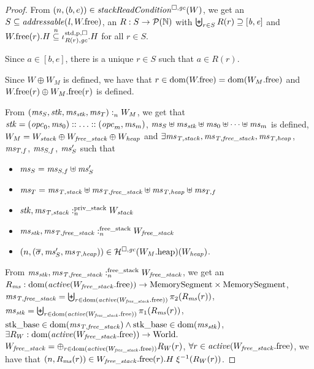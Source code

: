 \begin{proof}
  From $\npair{(b,e)}\in\stackReadCond{W}$, we get an $S \subseteq \addressable{\lin,
    \pwfree}$, an $R : S \rightarrow \powerset{\nats}$ with $\biguplus_{r \in S} R(r) \supseteq [\baddr,\eaddr]$ and $\pwfree(r).H
  \nsubeq \stdreg{R(r),\gc}{\pur}.H$ for all $r \in S$.

  Since $a \in [b,e]$, there is a unique $r \in S$ such that $a \in R(r)$.

  Since $W \oplus W_M$ is defined, we have that $r \in \dom(\pwfree) =
  \dom(\pwfree[W_M])$ and $\pwfree(r) \oplus \pwfree[W_M](r)$ is defined.

  From $\memSat{(\ms_S,\stk,\ms_\stk,\ms_T)}{W_M}$, we get that
  $\stk = (\opc_0,\ms_0):: \dots :: (\opc_m,\ms_m)$,
  $\ms_S \uplus \ms_\stk \uplus \ms_0 \uplus \dots \uplus \ms_m$ is defined,
  $W_M = W_{\var{stack}} \oplus W_{\var{free\_stack}} \oplus W_{\var{heap}}$ and
  $\exists \ms_\var{T,stack}, \ms_\var{T,free\_stack}, \ms_\var{T,heap}$, $\ms_{T,f}$, $\ms_{S,f}$, $\ms_S'$ such that
  \begin{itemize}
  \item $\ms_S =\ms_{S,f} \uplus \ms_S'$
  \item $\ms_T = \ms_\var{T,stack} \uplus \ms_\var{T,free\_stack} \uplus
    \ms_\var{T,heap} \uplus \ms_{T,f}$
  \item $\memSatStack{\stk,\ms_\var{T,stack}}{W_{\var{stack}}}$
  \item $\memSatFStack{\ms_\stk,\ms_\var{T,free\_stack}}{W_{\var{free\_stack}}}$
  \item $\npair{(\overline{\sigma},\ms_S',\ms_\var{T,heap})}\in\lrheap(\pwheap[W_M])(W_\var{heap})$.
  \end{itemize}

  From $\memSatFStack{\ms_\stk,\ms_\var{T,free\_stack}}{W_{\var{free\_stack}}}$, we get an
  $R_\ms : \dom(\activeReg{\pwfree[W_\var{free\_stack}]}) \fun \MemSeg \times \MemSeg$,
  $\ms_\var{T,free\_stack} = \biguplus_{r \in \dom(\activeReg{\pwfree[W_\var{free\_stack}]})} \pi_2(R_\ms(r))$,
  $\ms_\stk = \biguplus_{r \in \dom(\activeReg{\pwfree[W_\var{free\_stack}]})} \pi_1(R_\ms(r))$,
  $\stkb \in \dom(\ms_\var{T,free\_stack}) \wedge \stkb \in \dom(\ms_\stk)$,
  $\exists R_W : \dom(\activeReg{\pwfree[W_\var{free\_stack}]}) \fun \World\ldotp$
  $W_\var{free\_stack} = \oplus_{r \in \dom(\activeReg{\pwfree[W_\var{free\_stack}]})} R_W(r)$,
  $\forall r \in \activeReg{\pwfree[W_\var{free\_stack}]}$, we have that
  $\npair{R_\ms(r)} \in  \pwfree[W_\var{free\_stack}](r).H \; \xi^{-1}(R_W(r))$.


\end{proof}
